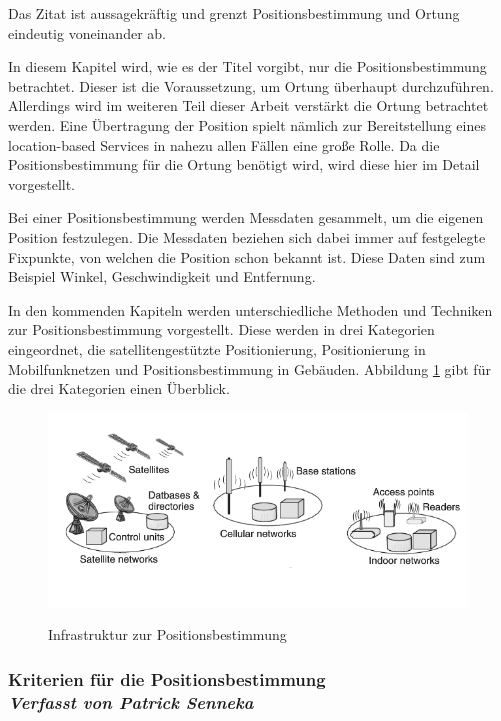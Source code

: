 Das Zitat ist aussagekräftig und grenzt Positionsbestimmung und Ortung eindeutig voneinander ab.

In diesem Kapitel wird, wie es der Titel vorgibt, nur die Positionsbestimmung betrachtet. Dieser ist die Voraussetzung, um Ortung
überhaupt durchzuführen. Allerdings wird im weiteren Teil dieser Arbeit verstärkt die Ortung betrachtet werden. Eine Übertragung der Position spielt nämlich zur Bereitstellung eines location-based Services in nahezu allen Fällen eine große Rolle. Da die Positionsbestimmung für die Ortung benötigt wird, wird diese hier im Detail vorgestellt. 


Bei einer Positionsbestimmung werden Messdaten gesammelt, um die eigenen Position festzulegen. Die Messdaten beziehen sich dabei immer auf festgelegte Fixpunkte, von welchen die Position schon bekannt ist.  Diese Daten sind zum Beispiel Winkel, Geschwindigkeit und Entfernung.

In den kommenden Kapiteln werden unterschiedliche Methoden und Techniken zur Positionsbestimmung vorgestellt. Diese werden in drei Kategorien eingeordnet, die satellitengestützte Positionierung, Positionierung in Mobilfunknetzen und Positionsbestimmung in Gebäuden.
Abbildung \ref{fig:Positionsbestimmung} gibt für die drei Kategorien einen Überblick.

\begin{figure}[h]
\centering
\includegraphics[width=0.99\textwidth]{ref/images/Positionsbestimmung.PNG}
\caption[Infrastruktur zur Positionsbestimmung]{Infrastruktur zur Positionsbestimmung}
\label{fig:Positionsbestimmung}
\cite[S. 124]{Kuepper2005}
\end{figure}

\subsubsection[Kriterien für die Positionsbestimmung]{Kriterien für die Positionsbestimmung
 \\ \textnormal{\small{\textit {Verfasst von Patrick Senneka}}}}

